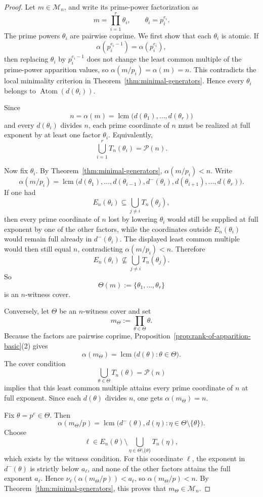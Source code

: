 \documentclass[11pt,letterpaper]{article}
\numberwithin{equation}{section}
\theoremstyle{plain}
\theoremstyle{definition}
\theoremstyle{remark}
\DeclareMathOperator{\lcmop}{lcm}
\DeclareMathOperator{\Atom}{Atom}
\begin{document}
\begin{proof}
Let $m\in\mathcal M_n$, and write its prime-power factorization as
\[
m=\prod_{i=1}^r \theta_i,
\qquad
\theta_i=p_i^{e_i}.
\]
The prime powers $\theta_i$ are pairwise coprime. We first show that each
$\theta_i$ is atomic. If
\[
\alpha(p_i^{e_i-1})=\alpha(p_i^{e_i}),
\]
then replacing $\theta_i$ by $p_i^{e_i-1}$ does not change the least common
multiple of the prime-power apparition values, so
$\alpha(m/p_i)=\alpha(m)=n$. This contradicts the local minimality criterion in
Theorem~\ref{thm:minimal-generators}. Hence every $\theta_i$ belongs to
$\Atom(d(\theta_i))$.

Since
\[
n=\alpha(m)=\lcmop\bigl(d(\theta_1),\dots,d(\theta_r)\bigr)
\]
and every $d(\theta_i)$ divides $n$, each prime coordinate of $n$ must be
realized at full exponent by at least one factor $\theta_i$. Equivalently,
\[
\bigcup_{i=1}^r T_n(\theta_i)=\mathcal P(n).
\]

Now fix $\theta_i$. By Theorem~\ref{thm:minimal-generators},
$\alpha(m/p_i)<n$. Write
\[
\alpha(m/p_i)=\lcmop\bigl(d(\theta_1),\dots,d(\theta_{i-1}),
d^{-}(\theta_i),d(\theta_{i+1}),\dots,d(\theta_r)\bigr).
\]
If one had
\[
E_n(\theta_i)\subseteq \bigcup_{j\ne i}T_n(\theta_j),
\]
then every prime coordinate of $n$ lost by lowering $\theta_i$ would still be
supplied at full exponent by one of the other factors, while the coordinates
outside $E_n(\theta_i)$ would remain full already in $d^{-}(\theta_i)$. The
displayed least common multiple would then still equal $n$, contradicting
$\alpha(m/p_i)<n$. Therefore
\[
E_n(\theta_i)\nsubseteq \bigcup_{j\ne i}T_n(\theta_j).
\]
So
\[
\Theta(m):=\{\theta_1,\dots,\theta_r\}
\]
is an $n$-witness cover.

Conversely, let $\Theta$ be an $n$-witness cover and set
\[
m_\Theta:=\prod_{\theta\in\Theta}\theta.
\]
Because the factors are pairwise coprime, Proposition~\ref{prop:rank-of-apparition-basic}(2)
gives
\[
\alpha(m_\Theta)=\lcmop\bigl(d(\theta):\theta\in\Theta\bigr).
\]
The cover condition
\[
\bigcup_{\theta\in\Theta}T_n(\theta)=\mathcal P(n)
\]
implies that this least common multiple attains every prime coordinate of $n$
at full exponent. Since each $d(\theta)$ divides $n$, one gets
$\alpha(m_\Theta)=n$.

Fix $\theta=p^e\in\Theta$. Then
\[
\alpha(m_\Theta/p)=
\lcmop\bigl(d^{-}(\theta),d(\eta):\eta\in\Theta\setminus\{\theta\}\bigr).
\]
Choose
\[
\ell\in E_n(\theta)\setminus
\bigcup_{\eta\in\Theta\setminus\{\theta\}}T_n(\eta),
\]
which exists by the witness condition. For this coordinate $\ell$, the
exponent in $d^{-}(\theta)$ is strictly below $a_\ell$, and none of the other
factors attains the full exponent $a_\ell$. Hence
$\nu_\ell(\alpha(m_\Theta/p))<a_\ell$, so $\alpha(m_\Theta/p)<n$. By
Theorem~\ref{thm:minimal-generators}, this proves that $m_\Theta\in\mathcal M_n$.
\end{proof}
\end{document}
